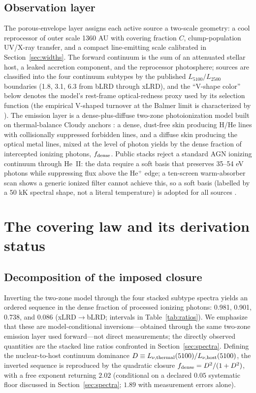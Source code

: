 \documentclass[twocolumn]{aastex631}
\begin{document}
\subsection{Observation layer}
The porous-envelope layer assigns each active source a two-scale geometry:
a cool reprocessor of outer scale 1360 AU with covering fraction $C$,
clump-population UV/X-ray transfer, and a compact line-emitting scale
calibrated in Section~\ref{sec:widths}. The forward continuum is the sum
of an attenuated stellar host, a leaked accretion component, and the
reprocessor photosphere; sources are classified into the four continuum
subtypes by the published $L_{5100}/L_{2500}$ boundaries (1.8, 3.1, 6.3
from bLRD through xLRD), and the ``V-shape color'' below denotes the
model's rest-frame optical-redness proxy used by its selection function
(the empirical V-shaped turnover at the Balmer limit is characterized by
\citealt{Setton2024}).
The emission layer is a dense-plus-diffuse two-zone photoionization model
built on thermal-balance Cloudy anchors \citep[C23 release; a locally
verified C25 build is used;][]{Chatzikos2023}: a dense, dust-free skin
producing H/He lines with collisionally suppressed forbidden lines, and a
diffuse skin producing the optical metal lines, mixed at the level of
photon yields by the dense fraction of intercepted ionizing photons,
$f_{\rm dense}$. Public stacks reject a standard AGN ionizing continuum
through He~II: the data require a soft basis that preserves 35--54 eV
photons while suppressing flux above the He$^{+}$ edge; a ten-screen
warm-absorber scan shows a generic ionized filter cannot achieve this, so
a soft basis (labelled by a 50 kK spectral shape, not a literal
temperature) is adopted for all sources
\citep{PerezGonzalez2026,Sok2026}.

\section{The covering law and its derivation status}\label{sec:closure}

\subsection{Decomposition of the imposed closure}\label{sec:decomp}
Inverting the two-zone model through the four stacked subtype spectra
yields an ordered sequence in the dense fraction of processed ionizing
photons: 0.981, 0.901, 0.738, and 0.086 (xLRD$\rightarrow$bLRD; intervals
in Table~\ref{tab:ratios}). We emphasize that these are model-conditional
inversions---obtained through the same two-zone emission layer used
forward---not direct measurements; the directly observed quantities are
the stacked line ratios confronted in Section~\ref{sec:spectra}. Defining
the nuclear-to-host continuum dominance
$D\equiv L_{\nu,\rm thermal}(5100)/L_{\nu,\rm host}(5100)$, the inverted
sequence is reproduced by the quadratic closure
$f_{\rm dense}=D^{2}/(1+D^{2})$, with a free exponent returning
$2.02$ (conditional on a declared $0.05$ systematic floor discussed in
Section~\ref{sec:spectra}; $1.89$ with measurement errors alone).
\end{document}
